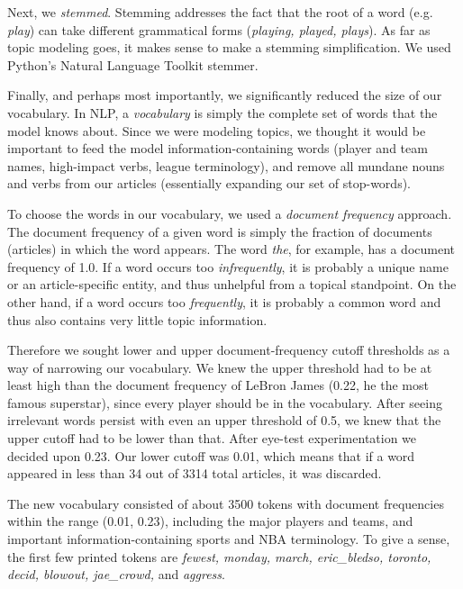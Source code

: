 \documentclass[11pt]{article}
\begin{document}
Next, we \textit{stemmed}. Stemming addresses the fact that the root of a word (e.g. \textit{play}) can take different grammatical forms (\textit{playing, played, plays}). As far as topic modeling goes, it makes sense to make a stemming simplification. We used Python's Natural Language Toolkit stemmer.

Finally, and perhaps most importantly, we significantly reduced the size of our vocabulary. In NLP, a \textit{vocabulary} is simply the complete set of words that the model knows about.  Since we were modeling topics, we thought it would be important to feed the model information-containing words (player and team names, high-impact verbs, league terminology), and remove all mundane nouns and verbs from our articles (essentially expanding our set of stop-words). 

To choose the words in our vocabulary, we used a \textit{document frequency} approach. The document frequency of a given word is simply the fraction of documents (articles) in which the word appears. The word \textit{the}, for example, has a document frequency of 1.0. If a word occurs too \textit{infrequently}, it is probably a unique name or an article-specific entity, and thus unhelpful from a topical standpoint. On the other hand, if a word occurs too \textit{frequently}, it is probably a common word and thus also contains very little topic information.

Therefore we sought lower and upper document-frequency cutoff thresholds as a way of narrowing our vocabulary.  We knew the upper threshold had to be at least high than the document frequency of LeBron James (0.22, he the most famous superstar), since every player should be in the vocabulary. After seeing irrelevant words persist with even an upper threshold of 0.5, we knew that the upper cutoff had to be lower than that. After eye-test experimentation we decided upon 0.23. Our lower cutoff was 0.01, which means that if a word appeared in less than 34 out of 3314 total articles, it was discarded.

The new vocabulary consisted of about 3500 tokens with document frequencies within the range (0.01, 0.23), including the major players and teams, and important information-containing sports and NBA terminology.  To give a sense, the first few printed tokens are \textit{fewest, monday, march, eric\_bledso, toronto, decid, blowout, jae\_crowd,} and \textit{aggress}.  
\end{document}
